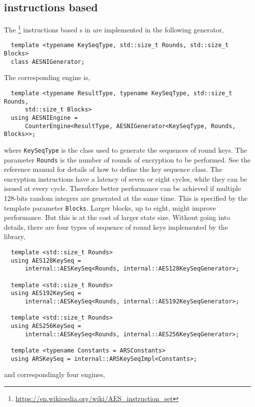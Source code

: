 \subsection{\protect\aesni instructions based \protect\rng}
\label{sub:AES-NI instructions based RNG}

The \aesni\footnote{\url{https://en.wikipedia.org/wiki/AES_instruction_set}}
instructions based \rng{}s in \textcite{Salmon:2011um} are implemented in the
following generator,
\begin{Verbatim}
  template <typename KeySeqType, std::size_t Rounds, std::size_t Blocks>
  class AESNIGenerator;
\end{Verbatim}
The corresponding \rng engine is,
\begin{Verbatim}
  template <typename ResultType, typename KeySeqType, std::size_t Rounds,
      std::size_t Blocks>
  using AESNIEngine =
      CounterEngine<ResultType, AESNIGenerator<KeySeqType, Rounds, Blocks>>;
\end{Verbatim}
where \verb|KeySeqType| is the class used to generate the sequences of round
keys. The parameter \verb|Rounds| is the number of rounds of \aes encryption to
be performed. See the reference manual for details of how to define the key
sequence class. The \aesni encryption instructions have a latency of seven or
eight cycles, while they can be issued at every cycle. Therefore better
performance can be achieved if multiple 128-bits random integers are generated
at the same time. This is specified by the template parameter \verb|Blocks|.
Larger blocks, up to eight, might improve performance. But this is at the cost
of larger state size. Without going into details, there are four types of
sequence of round keys implemented by the library,
\begin{Verbatim}
  template <std::size_t Rounds>
  using AES128KeySeq =
      internal::AESKeySeq<Rounds, internal::AES128KeySeqGenerator>;

  template <std::size_t Rounds>
  using AES192KeySeq =
      internal::AESKeySeq<Rounds, internal::AES192KeySeqGenerator>;

  template <std::size_t Rounds>
  using AES256KeySeq =
      internal::AESKeySeq<Rounds, internal::AES256KeySeqGenerator>;

  template <typename Constants = ARSConstants>
  using ARSKeySeq = internal::ARSKeySeqImpl<Constants>;
\end{Verbatim}
and correspondingly four \rng engines,
